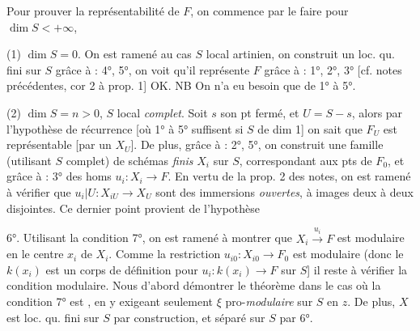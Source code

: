 \documentclass[11pt,a4paper]{article}
\begin{document}
Pour prouver la représentabilité de $F$, on commence par le faire pour
$\dim S < +\infty$, \struck{\ill{}}

(1) $\dim S = 0$. On est ramené au cas $S$ local artinien, on construit un
 loc. qu. fini sur $S$ grâce à : 4°, 5°, on voit qu'il
représente $F$ grâce à : 1°, 2°, 3° [cf. notes précédentes, cor 2 à
prop. 1] OK. NB On n'a eu besoin que de 1° à 5°.


(2) $\dim S = n > 0$, $S$ local \emph{complet}. Soit $s$ son pt fermé, et
$U = S - s$, alors par l'hypothèse de récurrence [où 1° à 5° suffisent si
$S$ de dim 1] on sait que $F_U$ est représentable [par un $X_U$]. De plus,
grâce à : 2°, 5°, on construit une famille (utilisant $S$ complet) de
schémas \emph{finis} $X_i$ sur $S$, correspondant aux pts de $F_0$, et
\struck{\ill{}} grâce à : 3° des homs $u_i : X_i \to F$. En vertu de la
prop. 2 des notes, on est ramené à vérifier que
$u_i|U : X_{iU} \to X_U$ sont des  immersions
\emph{ouvertes}, à images deux à deux disjointes. Ce dernier point provient
de l'hypothèse


6°. Utilisant la condition 7°, on est ramené à montrer que
$X_i \xrightarrow{u_i} F$ est modulaire en le centre $x_i$ de $X_i$. Comme
la restriction $u_{i0} : X_{i0} \to F_0$ est modulaire (donc
\struck{\ill{}} le $k(x_i)$ est un corps de définition pour
$u_i : k(x_i) \to F$ sur $S$] il reste à vérifier la condition modulaire.
Nous \ill{} \ill{} d'abord démontrer le théorème dans le cas où la
condition 7° est , en y exigeant seulement $\xi$
pro-\emph{modulaire} sur $S$ en $z$. De plus, $X$ est loc. qu. fini sur
$S$ par construction, et séparé sur $S$ par 6°.

\end{document}
